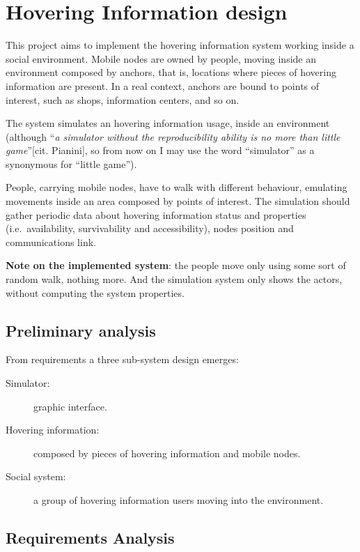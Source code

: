 \section{Hovering Information design}
\label{sec:design}

This project aims to implement the hovering information system working inside
a social environment. Mobile nodes are owned by people, moving inside an
environment composed by anchors, that is, locations where pieces of hovering
information are present. In a real context, anchors are bound to points of
interest, such as shops, information centers, and so on.

The system simulates an hovering information usage, inside an environment
(although ``\emph{a simulator without the reproducibility ability is no more
than little game}''[cit. Pianini], so from now on I may use the word
``simulator'' as a synonymous for ``little game'').

People, carrying mobile nodes, have to walk with different behaviour, emulating
movements inside an area composed by points of interest.  The simulation should
gather periodic data about hovering information status and properties (i.e.\
availability, survivability and accessibility), nodes position and
communications link.

\textbf{Note on the implemented system}: the people move only using some sort of random
walk, nothing more. And the simulation system only shows the actors, without
computing the system properties.

\subsection{Preliminary analysis}

From requirements a three sub-system design emerges:
\begin{description}
	\item[Simulator:] graphic interface.
	\item[Hovering information:] composed by pieces of hovering information and
		mobile nodes.
	\item[Social system:] a group of hovering information users moving into
		the environment.
\end{description}

\subsection{Requirements Analysis}

